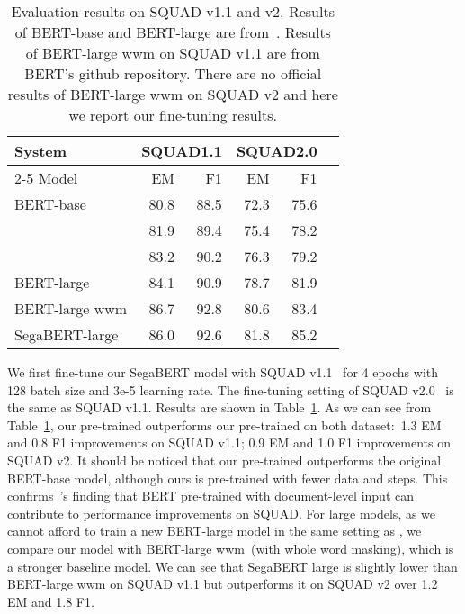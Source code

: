 \documentclass[letterpaper]{article}
\begin{document}
\begin{table}[t]\centering
  \small
  \begin{tabular}{lrrrrr}\toprule
  \multirow{2}{*}{System} &\multicolumn{2}{c}{SQUAD1.1} &\multicolumn{2}{c}{SQUAD2.0} \\\cmidrule{2-5}
  Model&EM &F1 &EM &F1 \\\midrule
  BERT-base &80.8 &88.5 &72.3 &75.6 \\
   &81.9 &89.4 &75.4 &78.2 \\
   &83.2 &90.2 &76.3 &79.2 \\
  BERT-large &84.1 &90.9 &78.7 &81.9 \\
  BERT-large wwm &86.7 &92.8 &80.6 &83.4 \\
  SegaBERT-large &86.0 &92.6 &81.8 &85.2 \\
  \bottomrule
  \end{tabular}
  \caption{Evaluation results on SQUAD v1.1 and v2. Results of BERT-base and BERT-large are from~\citet{DBLP:journals/corr/bert}. Results of BERT-large wwm on SQUAD v1.1 are from BERT's github repository. There are no official results of BERT-large wwm on SQUAD v2 and here we report our fine-tuning results.}

  \label{tab: squad}
  \end{table} 
We first fine-tune our SegaBERT model with SQUAD v1.1~\cite{DBLP:conf/emnlp/squad11} for 4 epochs with 128 batch size and 3e-5 learning rate. The fine-tuning setting of SQUAD v2.0~\cite{DBLP:conf/acl/squad2} is the same as SQUAD v1.1. Results are shown in Table~\ref{tab: squad}. 
As we can see from Table~\ref{tab: squad}, our pre-trained  outperforms our pre-trained  on both dataset:\ 1.3 EM and 0.8 F1 improvements on SQUAD v1.1; 0.9 EM and 1.0 F1 improvements on SQUAD v2. 
It should be noticed that our pre-trained  outperforms the original BERT-base model, although ours is pre-trained with fewer data and steps. 
This confirms~\citet{DBLP:journals/corr/abs-1907-11692}'s finding that BERT pre-trained with document-level input can contribute to performance improvements on SQUAD.
For large models, as we cannot afford to train a new BERT-large model in the same setting as , we compare our model with BERT-large wwm~(with whole word masking), which is a stronger baseline model.
We can see that SegaBERT large is slightly lower than BERT-large wwm on SQUAD v1.1 but outperforms it on SQUAD v2 over 1.2 EM and 1.8 F1.
\end{document}
